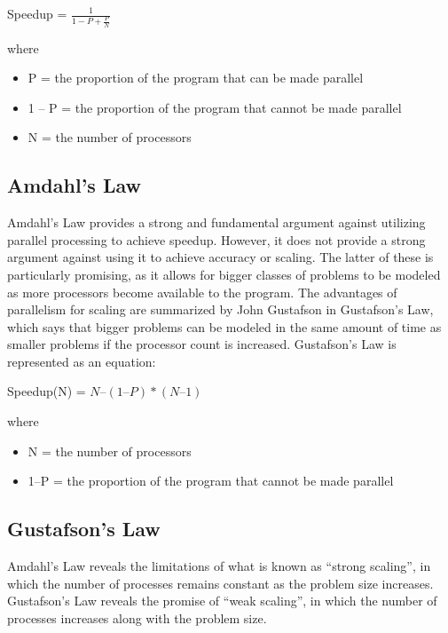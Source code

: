 \documentclass[letterpaper,10pt,openany,oneside]{sphinxmanual}
\begin{document}
Speedup = $\frac{1}{1-P+\frac{P}{N}}$

where
\begin{itemize}
\item {} 
P = the proportion of the program that can be made parallel

\item {} 
1 – P = the proportion of the program that cannot be made parallel

\item {} 
N = the number of processors

\end{itemize}


\subsection{Amdahl’s Law}
\label{0-Introduction/introduction:amdahls-law}
Amdahl’s Law provides a strong and fundamental argument against
utilizing parallel processing to achieve speedup. However, it does not
provide a strong argument against using it to achieve accuracy or
scaling. The latter of these is particularly promising, as it allows for
bigger classes of problems to be modeled as more processors become
available to the program. The advantages of parallelism for scaling are
summarized by John Gustafson in Gustafson’s Law, which says that bigger
problems can be modeled in the same amount of time as smaller problems
if the processor count is increased. Gustafson’s Law is represented as
an equation:

Speedup(N) = $N–(1–P)*(N–1)$

where
\begin{itemize}
\item {} 
N = the number of processors

\item {} 
1–P = the proportion of the program that cannot be made parallel

\end{itemize}


\subsection{Gustafson’s Law}
\label{0-Introduction/introduction:gustafsons-law}
Amdahl’s Law reveals the limitations of what is known as “strong
scaling”, in which the number of processes remains constant as the
problem size increases. Gustafson’s Law reveals the promise of “weak
scaling”, in which the number of processes increases along with the
problem size.
\end{document}
